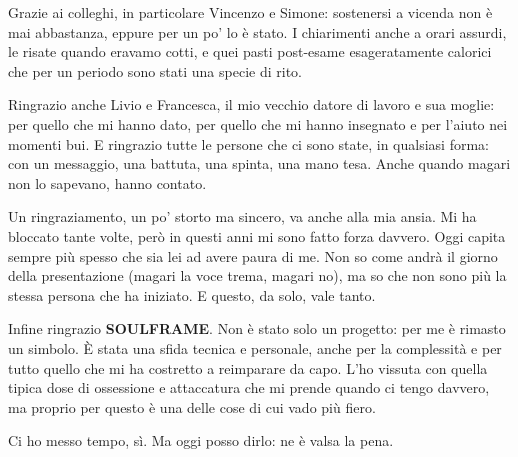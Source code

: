 Grazie ai colleghi, in particolare Vincenzo e Simone: sostenersi a vicenda non è mai abbastanza, eppure per un po' lo è stato. I chiarimenti anche a orari assurdi, le risate quando eravamo cotti, e quei pasti post-esame esageratamente calorici che per un periodo sono stati una specie di rito.

Ringrazio anche Livio e Francesca, il mio vecchio datore di lavoro e sua moglie: per quello che mi hanno dato, per quello che mi hanno insegnato e per l'aiuto nei momenti bui. E ringrazio tutte le persone che ci sono state, in qualsiasi forma: con un messaggio, una battuta, una spinta, una mano tesa. Anche quando magari non lo sapevano, hanno contato.

Un ringraziamento, un po' storto ma sincero, va anche alla mia ansia. Mi ha bloccato tante volte, però in questi anni mi sono fatto forza davvero. Oggi capita sempre più spesso che sia lei ad avere paura di me. Non so come andrà il giorno della presentazione (magari la voce trema, magari no), ma so che non sono più la stessa persona che ha iniziato. E questo, da solo, vale tanto.

Infine ringrazio \textbf{SOULFRAME}. Non è stato solo un progetto: per me è rimasto un simbolo. È stata una sfida tecnica e personale, anche per la complessità e per tutto quello che mi ha costretto a reimparare da capo. L'ho vissuta con quella tipica dose di ossessione e attaccatura che mi prende quando ci tengo davvero, ma proprio per questo è una delle cose di cui vado più fiero.

Ci ho messo tempo, sì. Ma oggi posso dirlo: ne è valsa la pena.
